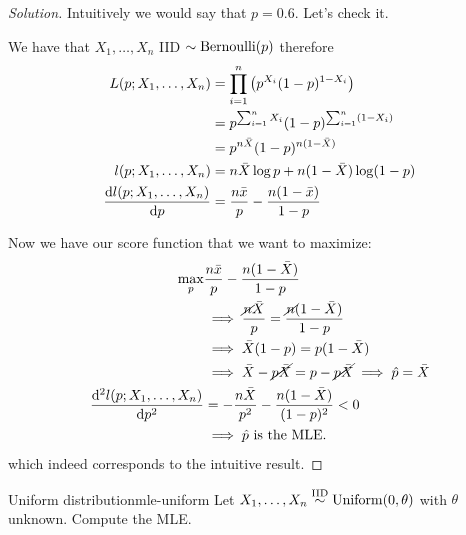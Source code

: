\documentclass[12pt]{extarticle}
\newcommand{\Bernoulli}{{\operatorfont Bernoulli}}
\newcommand{\Uniform}{{\operatorfont Uniform}}
\begin{document}
\begin{proof}[Solution]
	Intuitively we would say that $p = 0.6$.
	Let's check it.

	We have that $X_1, \dots, X_n$ IID $\sim \Bernoulli(p)$ therefore
	\begin{align}
		L(p; X_1, \dots, X_n)         & = \prod_{i = 1}^n \left( p^{X_i} (1 - p)^{1-X_i} \right)   \\
		                              & = p ^{\sum_{i = 1}^n X_i} (1-p) ^{\sum_{i = 1}^n (1- X_i)} \\
		                              & = p^{n \bar X} (1-p)^{n(1-\bar{X})}                        \\
		l(p; X_1, \dots, X_n)         & = n \bar X \log p + n(1- \bar{X}) \log(1-p)                \\
		\dv{l(p; X_1, \dots, X_n)}{p} & = \frac{n \bar x}{p} - \frac{n(1-\bar{x})}{1-p}
	\end{align}

	Now we have our score function that we want to maximize:
	\begin{align}
		\max_p                           & \frac{n \bar x}{p} - \frac{n(1-\bar{X})}{1-p}                             \\
		                                 & \implies \frac{\cancel {n} \bar X}{p} = \frac{\cancel{n}(1-\bar{X})}{1-p} \\
		                                 & \implies \bar{X} (1-p) = p (1-\bar X)                                     \\
		                                 & \implies \bar{X} -\cancel{p\bar{X}} = p -\cancel{p\bar{X}}
		\implies \hat p = \bar{X}                                                                                    \\
		\dv[2]{l(p; X_1, \dots, X_n)}{p} & = -\frac{n \bar{X}}{p^2} - \frac{n(1-\bar X)}{(1-p)^2} < 0                \\
		                                 & \implies \hat p \text{ is the MLE.}
	\end{align}
	which indeed corresponds to the intuitive result.
\end{proof}

\begin{example}{Uniform distribution}{mle-uniform}
	Let $X_1, \dots, X_n \stackrel{\text{IID}}{\sim} \Uniform(0,\theta)$ with $\theta$ unknown.
	Compute the MLE.
\end{example}
\end{document}
